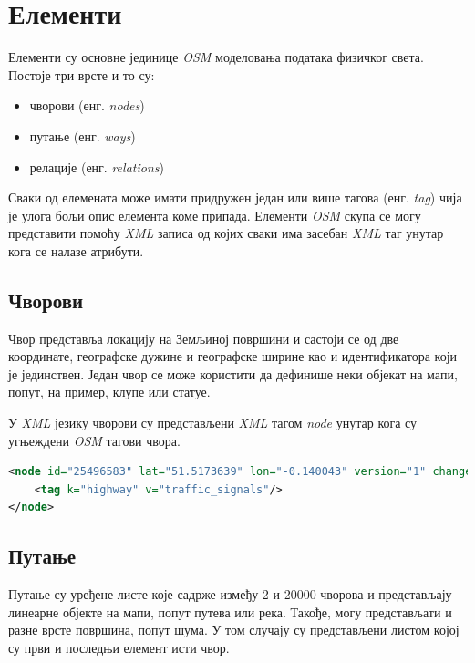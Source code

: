 \documentclass[12pt,oneside]{memoir}
\begin{document}
\section{Елементи}
\label{sec:osm_elementi}

Елементи су основне јединице \textit{OSM} моделовања података физичког света. Постоје три врсте и то су:

\begin{itemize}
\item чворови (енг. \textit{nodes})
\item путање (енг. \textit{ways})
\item релације (енг. \textit{relations})
\end{itemize}

Сваки од елемената може имати придружен један или више тагова (енг. \textit{tag}) чија је улога бољи опис елемента коме припада. Елементи \textit{OSM} скупа се могу представити помоћу \textit{XML} записа од којих сваки има засебан \textit{XML} таг унутар кога се налазе атрибути. \cite{osm_wiki}

\subsection{Чворови}
\label{subsec:osm_nodes}

Чвор представља локацију на Земљиној површини и састоји се од две координате, географске дужине и географске ширине као и идентификатора који је јединствен. Један чвор се може користити да дефинише неки објекат на мапи, попут, на пример, клупе или статуе. \cite{osm_wiki}

У \textit{XML} језику чворови су представљени \textit{XML} тагом \textit{node} унутар кога су угњеждени \textit{OSM} тагови чвора.

\begin{lstlisting}[language=XML]
<node id="25496583" lat="51.5173639" lon="-0.140043" version="1" changeset="203496" user="80n" uid="1238" visible="true" timestamp="2007-01-28T11:40:26Z">
    <tag k="highway" v="traffic_signals"/>
</node>
\end{lstlisting}

\subsection{Путање}
\label{subsec:osm_ways}

Путање су уређене листе које садрже између 2 и 20000 чворова и представљају линеарне објекте на мапи, попут путева или река. Такође, могу представљати и разне врсте површина, попут шума. У том случају су представљени листом којој су први и последњи елемент исти чвор. \cite{osm_wiki}
\end{document}
